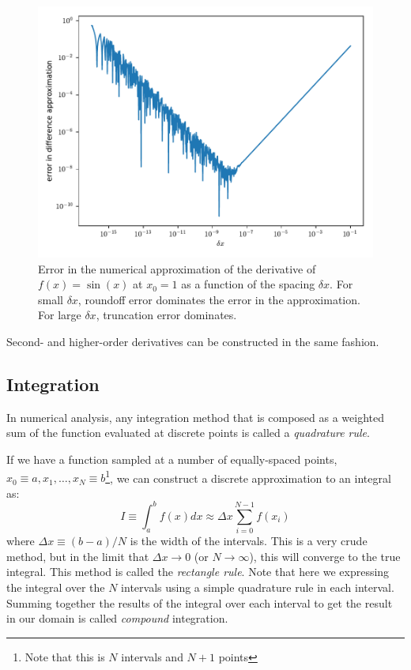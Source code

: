 \begin{figure}
  \centering
  \includegraphics[width=0.8\linewidth]{deriv_error}
  \caption[Error in numerical derivatives] {\label{fig:deriv_error}
    Error in the numerical approximation of the derivative of $f(x) =
    \sin(x)$ at $x_0 = 1$ as a function of the spacing $\delta x$.  For
    small $\delta x$, roundoff error dominates the error in the
    approximation.  For large $\delta x$, truncation error dominates.}
\end{figure}

Second- and higher-order derivatives can be constructed in the same fashion.


\subsection{Integration}

In numerical analysis, any integration method that is composed as a
weighted sum of the function evaluated at discrete points is called a
{\em quadrature rule}.  

If we have a function sampled at a number of
equally-spaced points, $x_0 \equiv a, x_1, \ldots, x_N \equiv
b$\footnote{Note that this is $N$ intervals and $N+1$ points}, we can
construct a discrete approximation to an integral as:
\begin{equation}
I \equiv \int_a^b f(x) dx \approx \Delta x \sum_{i = 0}^{N-1} f(x_i)
\end{equation}
where $\Delta x \equiv (b-a)/N$ is the width of the intervals.  This
is a very crude method, but in the limit that $\Delta x \rightarrow 0$
(or $N \rightarrow \infty$), this will converge to the true integral.
This method is called the {\em rectangle rule}.  Note that here we
expressing the integral over the $N$ intervals using a simple
quadrature rule in each interval.  Summing together the results of the
integral over each interval to get the result in our domain is called
{\em compound} integration.

